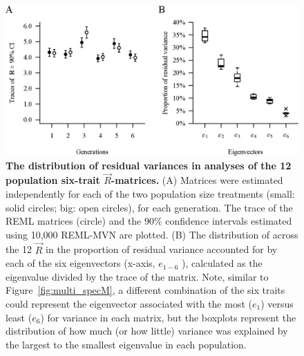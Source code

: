 \begin{figure}[htp]
\includegraphics[width=1\textwidth]{Chp3_Multi/R_traceNeigs.eps}
\vspace*{-0.4cm}
\caption[The distribution of residual variances in analyses of the 12 population six-trait \textbf{R}-matrices.]{\textbf{The distribution of residual variances in analyses of the 12 population six-trait $\vec{R}$-matrices.} (A) Matrices were estimated independently for each of the two population size treatments (small: solid circles; big: open circles), for each generation. The trace of the REML matrices (circle) and the 90\% confidence intervals estimated using 10,000 REML-MVN are plotted. (B) The distribution of across the 12 $\vec{R}$ in the proportion of residual variance accounted for by each of the six eigenvectors (x-axis, $e_{1-6}$ ), calculated as the eigenvalue divided by the trace of the matrix. Note, similar to Figure~\ref{fig:multi_specM}, a different combination of the six traits could represent the eigenvector associated with the most ($e_1$) versus least ($e_6$) for variance in each matrix, but the boxplots represent the distribution of how much (or how little) variance was explained by the largest to the smallest eigenvalue in each population. }
\label{fig:multi_specR}
\end{figure}
\FloatBarrier

